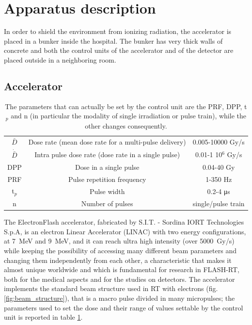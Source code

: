 \section{Apparatus description}
   In order to shield the environment from ionizing radiation, the accelerator is placed in a bunker inside the hospital. The bunker has very thick walls of concrete and both the control units of the accelerator and of the detector are placed outside in a neighboring room. 
   \subsection{Accelerator}
      \begin{table}
         \begin{center}
         \begin{tabular}{| c | c | c |}
         \hline
      $\bar{D}$ & Dose rate (mean dose rate for a multi-pulse delivery) & 0.005-10000 Gy/s\\
      $\Dot{\bar{D}}$ & Intra pulse dose rate (dose rate in a single pulse) &  0.01-1 10$^6$ Gy/s  \\
      DPP & Dose in a single pulse & 0.04-40 Gy\\
      PRF & Pulse repetition frequency & 1-350 Hz\\
      t$_{p}$ & Pulse width & 0.2-4 \si{\us}\\
      n & Number of pulses & single/pulse train \\
      \hline
         \end{tabular}
         \caption{The parameters that can actually be set by the control unit are the PRF, DPP, t$_p$ and n (in particular the modality of single irradiation or pulse train), while the other changes consequently.}
         \label{tab:beam_parameters}
         \end{center}
      \end{table}  
      The ElectronFlash accelerator, fabricated by S.I.T. - Sordina IORT Technologies S.p.A, is an electron Linear Accelerator (LINAC) with two energy configurations, at \SI{7}{MeV} and \SI{9}{MeV}, and it can reach ultra high intensity (over \SI{5000}{Gy/s}) while keeping the possibility of accessing many different beam parameters and changing them independently from each other, a characteristic that makes it almost unique worldwide and which is fundamental for research in FLASH-RT, both for the medical aspects and for the studies on detectors. 
      The accelerator implements the standard beam structure used in RT with electrons (fig. \ref{fig:beam_structure}), that is a macro pulse divided in many micropulses; the parameters used to set the dose and their range of values settable by the control unit is reported in table \ref{tab:beam_parameters}. 

